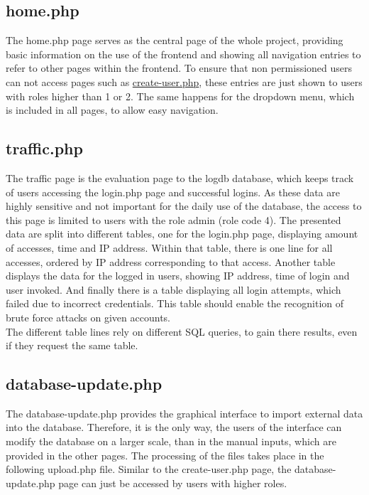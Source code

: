 
\subsection{home.php}

The home.php page serves as the central page of the whole project, providing basic information on the use of the frontend and showing all navigation entries to refer to other pages 
within the frontend. To ensure that non permissioned users can not access pages such as \hyperref[create-user.php]{create-user.php}, these entries are just shown to users with roles 
higher than 1 or 2. The same happens for the dropdown menu, which is included in all pages, to allow easy navigation. 

\subsection{traffic.php}
The traffic page is the evaluation page to the logdb database, which keeps track of users accessing the login.php page and successful logins. As these data are highly sensitive and 
not important for the daily use of the database, the access to this page is limited to users with the role admin (role code 4). The presented data are split into different tables, 
one for the login.php page, displaying amount of accesses, time and IP address. Within that table, there is one line for all accesses, ordered by IP address corresponding to that access. Another table displays the data for the logged in users, showing IP address, time of login and user invoked. And finally there is a table displaying all login attempts, which failed due to incorrect credentials. This table should enable the recognition of brute force attacks on given accounts.\\
The different table lines rely on different SQL queries, to gain there results, even if they request the same table.

\subsection{database-update.php}
The database-update.php provides the graphical interface to import external data into the database. Therefore, it is the only way, the users of the interface can modify the database 
on a larger scale, than in the manual inputs, which are provided in the other pages. The processing of the files takes place in the following upload.php file. Similar to the 
create-user.php page, the database-update.php page can just be accessed by users with higher roles. 


